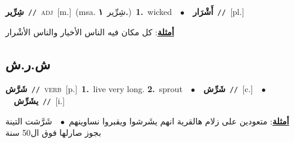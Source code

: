 \documentclass[10pt,a4paper,twoside]{article} %
\begin{document}
\begin{multicols}{2}
{\setlength\topsep{0pt}\textbf{\foreignlanguage{arabic}{شِرِّير}}\ {\color{gray}\texttt{//}\color{black}}\ \textsc{adj}\ [m.]\ \color{gray}(msa. \foreignlanguage{arabic}{شِرِّير}~\foreignlanguage{arabic}{\textbf{١.}})\color{black}\ \textbf{1.}~wicked\ \ $\bullet$\ \ \setlength\topsep{0pt}\textbf{\foreignlanguage{arabic}{أَشْرَار}}\ {\color{gray}\texttt{//}\color{black}}\ [pl.]\  \begin{flushright}\color{gray}\foreignlanguage{arabic}{\textbf{\underline{\foreignlanguage{arabic}{أمثلة}}}: كل مكان فيه الناس الأخيار والناس الأشْرار}\end{flushright}\color{black}} \vspace{2mm}

\vspace{-3mm}
\subsection*{\color{blue}\foreignlanguage{arabic}{ش.ر.ش}\color{blue}{}} 

{\setlength\topsep{0pt}\textbf{\foreignlanguage{arabic}{شَرَّش}}\ {\color{gray}\texttt{//}\color{black}}\ \textsc{verb}\ [p.]\ \textbf{1.}~live very long.  \textbf{2.}~sprout\ \ $\bullet$\ \ \setlength\topsep{0pt}\textbf{\foreignlanguage{arabic}{شَرِّش}}\ {\color{gray}\texttt{//}\color{black}}\ [c.]\ \ $\bullet$\ \ \setlength\topsep{0pt}\textbf{\foreignlanguage{arabic}{يشَرِّش}}\ {\color{gray}\texttt{//}\color{black}}\ [i.]\  \begin{flushright}\color{gray}\foreignlanguage{arabic}{\textbf{\underline{\foreignlanguage{arabic}{أمثلة}}}: متعودين على زلام هالقرية انهم يشَرشوا ويقبروا نساوينهم\ $\bullet$\ \  شَرَّشت التينة بجوز صارلها فوق ال50 سنة}\end{flushright}\color{black}} \vspace{2mm}


\end{multicols}
\end{document}
